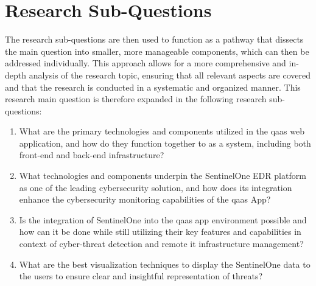 \section{Research Sub-Questions}
The research sub-questions are then used to function as a pathway that dissects the main
question into smaller, more manageable components, which can then be addressed individually. This approach
allows for a more comprehensive and in-depth analysis of the research topic, ensuring that all relevant
aspects are covered and that the research is conducted in a systematic and organized manner.
This research main question is therefore expanded in the following research sub-questions:
\begin{enumerate}
      \item What are the primary technologies and components utilized in the \acrshort{qaas} web application, and how do they function
            together to as a system, including both front-end and back-end infrastructure?
      \item What technologies and components underpin the SentinelOne EDR platform as one of the leading cybersecurity solution, and how
            does its integration enhance the cybersecurity monitoring capabilities of the \acrshort{qaas} App?
      \item Is the integration of SentinelOne into the \acrshort{qaas} app environment possible and how can it be done while still
            utilizing their key features and capabilities in context of cyber-threat detection and remote \acrshort{it} infrastructure
            management?
      \item What are the best visualization techniques to display the SentinelOne data to the users to ensure clear and insightful
            representation of threats?
\end{enumerate}
